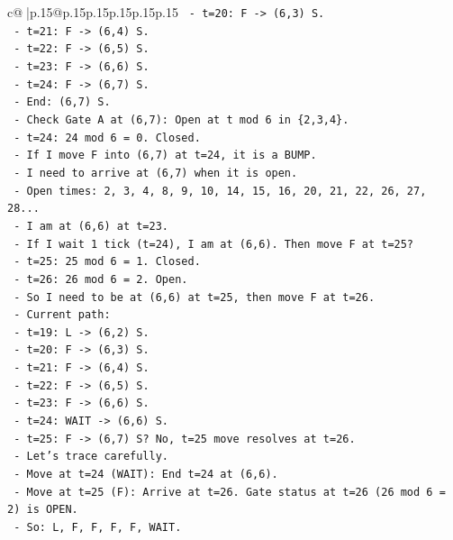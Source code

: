 \documentclass{article}
\begin{document}
{\begin{supertabular}{c@{$\;$}|p{.15\linewidth}@{}p{.15\linewidth}p{.15\linewidth}p{.15\linewidth}p{.15\linewidth}p{.15\linewidth}}
{{{\texttt{    {-} t=20: F {-}> (6,3) S.} \\
\texttt{    {-} t=21: F {-}> (6,4) S.} \\
\texttt{    {-} t=22: F {-}> (6,5) S.} \\
\texttt{    {-} t=23: F {-}> (6,6) S.} \\
\texttt{    {-} t=24: F {-}> (6,7) S.} \\
\texttt{    {-} End: (6,7) S.} \\
\texttt{  {-} Check Gate A at (6,7): Open at t mod 6 in \{2,3,4\}.} \\
\texttt{    {-} t=24: 24 mod 6 = 0. Closed.} \\
\texttt{    {-} If I move F into (6,7) at t=24, it is a BUMP.} \\
\texttt{    {-} I need to arrive at (6,7) when it is open.} \\
\texttt{    {-} Open times: 2, 3, 4, 8, 9, 10, 14, 15, 16, 20, 21, 22, 26, 27, 28...} \\
\texttt{    {-} I am at (6,6) at t=23.} \\
\texttt{    {-} If I wait 1 tick (t=24), I am at (6,6). Then move F at t=25?} \\
\texttt{    {-} t=25: 25 mod 6 = 1. Closed.} \\
\texttt{    {-} t=26: 26 mod 6 = 2. Open.} \\
\texttt{    {-} So I need to be at (6,6) at t=25, then move F at t=26.} \\
\texttt{    {-} Current path:} \\
\texttt{      {-} t=19: L {-}> (6,2) S.} \\
\texttt{      {-} t=20: F {-}> (6,3) S.} \\
\texttt{      {-} t=21: F {-}> (6,4) S.} \\
\texttt{      {-} t=22: F {-}> (6,5) S.} \\
\texttt{      {-} t=23: F {-}> (6,6) S.} \\
\texttt{      {-} t=24: WAIT {-}> (6,6) S.} \\
\texttt{      {-} t=25: F {-}> (6,7) S? No, t=25 move resolves at t=26.} \\
\texttt{      {-} Let's trace carefully.} \\
\texttt{      {-} Move at t=24 (WAIT): End t=24 at (6,6).} \\
\texttt{      {-} Move at t=25 (F): Arrive at t=26. Gate status at t=26 (26 mod 6 = 2) is OPEN.} \\
\texttt{      {-} So: L, F, F, F, F, WAIT.} \\
}}}
\end{supertabular}}
\end{document}

